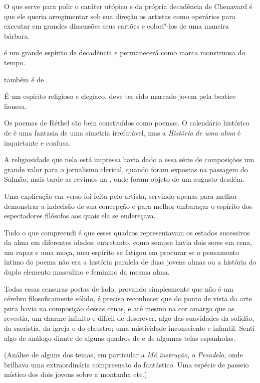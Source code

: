 O que serve para polir o caráter utópico e da própria decadência de
Chenavard é que ele queria arregimentar sob sua direção os artistas
como operários para executar em grandes dimensões seus
cartões e colori"-los de uma maneira bárbara.

 é um grande espírito de decadência e permanecerá como marca
monstruosa do tempo.

 também é de . 

É um espírito religioso e elegíaco, deve ter sido marcado jovem pela
beatice lionesa.

Os poemas de Réthel são bem construídos como poemas. O calendário
histórico de  é uma fantasia de uma simetria irrefutável, mas
a \textit{História de uma alma} é inquietante e confusa.

A religiosidade que nela está impressa havia dado a essa série de
composições um grande valor para o jornalismo clerical, quando foram
expostas na passagem do Salmão; mais tarde as revimos na , onde foram objeto de um augusto desdém.

Uma explicação em verso foi feita pelo artista, servindo apenas para
melhor demonstrar a indecisão de sua concepção e para melhor embaraçar
o espírito dos espectadores filósofos aos quais ela se endereçava.

Tudo o que compreendi é que esses quadros representavam os estados
sucessivos da alma em diferentes idades; entretanto, como sempre havia
dois seres em cena, um rapaz e uma moça, meu espírito se fatigou em
procurar se o pensamento íntimo do poema não era a história paralela de
duas jovens almas ou a história do duplo elemento masculino e feminino
da mesma alma.

Todas essas censuras postas de lado, provando simplesmente que 
não é um cérebro filosoficamente sólido, é preciso reconhecer que do
ponto de vista da arte pura havia na composição dessas cenas, e até
mesmo na cor amarga que as revestia, um charme infinito e difícil de
descrever, algo das suavidades da solidão, da sacristia, da igreja e do
claustro; uma misticidade inconsciente e infantil. Senti algo de
análogo diante de alguns quadros de  e de algumas telas
espanholas.

(Análise de alguns dos temas, em particular a \textit{Má instrução}, o
\textit{Pesadelo}, onde brilhava uma extraordinária compreensão do
fantástico. Uma espécie de passeio místico dos dois jovens sobre a
montanha etc.)

